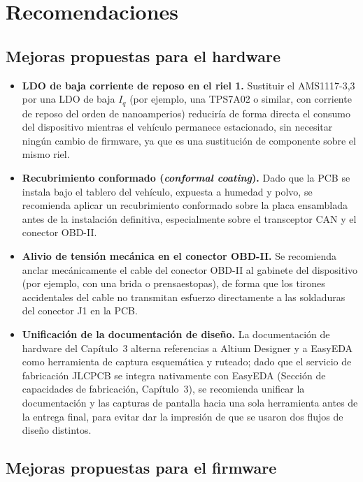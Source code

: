 \section{Recomendaciones}

\subsection{Mejoras propuestas para el hardware}
\label{sec:mejoras_hardware}

\begin{itemize}
	\item \textbf{LDO de baja corriente de reposo en el riel 1.} Sustituir el AMS1117-3,3 por una LDO de baja $I_q$ (por ejemplo, una TPS7A02 o similar, con corriente de reposo del orden de nanoamperios) reduciría de forma directa el consumo del dispositivo mientras el vehículo permanece estacionado, sin necesitar ningún cambio de firmware, ya que es una sustitución de componente sobre el mismo riel.
	\item \textbf{Recubrimiento conformado (\textit{conformal coating}).} Dado que la PCB se instala bajo el tablero del vehículo, expuesta a humedad y polvo, se recomienda aplicar un recubrimiento conformado sobre la placa ensamblada antes de la instalación definitiva, especialmente sobre el transceptor CAN y el conector OBD-II.
	\item \textbf{Alivio de tensión mecánica en el conector OBD-II.} Se recomienda anclar mecánicamente el cable del conector OBD-II al gabinete del dispositivo (por ejemplo, con una brida o prensaestopas), de forma que los tirones accidentales del cable no transmitan esfuerzo directamente a las soldaduras del conector J1 en la PCB.
	\item \textbf{Unificación de la documentación de diseño.} La documentación de hardware del Capítulo~3 alterna referencias a Altium Designer y a EasyEDA como herramienta de captura esquemática y ruteado; dado que el servicio de fabricación JLCPCB se integra nativamente con EasyEDA (Sección de capacidades de fabricación, Capítulo~3), se recomienda unificar la documentación y las capturas de pantalla hacia una sola herramienta antes de la entrega final, para evitar dar la impresión de que se usaron dos flujos de diseño distintos.
\end{itemize}

\subsection{Mejoras propuestas para el firmware}

